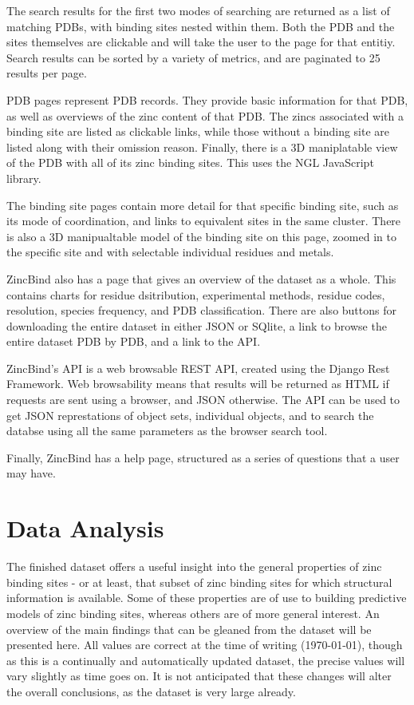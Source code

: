 The search results for the first two modes of searching are returned as a list of matching PDBs, with binding sites nested within them. Both the PDB and the sites themselves are clickable and will take the user to the page for that entitiy. Search results can be sorted by a variety of metrics, and are paginated to 25 results per page.

PDB pages represent PDB records. They provide basic information for that PDB, as well as overviews of the zinc content of that PDB. The zincs associated with a binding site are listed as clickable links, while those without a binding site are listed along with their omission reason. Finally, there is a 3D maniplatable view of the PDB with all of its zinc binding sites. This uses the NGL JavaScript library.

The binding site pages contain more detail for that specific binding site, such as its mode of coordination, and links to equivalent sites in the same cluster. There is also a 3D manipualtable model of the binding site on this page, zoomed in to the specific site and with selectable individual residues and metals.

ZincBind also has a page that gives an overview of the dataset as a whole. This contains charts for residue dsitribution, experimental methods, residue codes, resolution, species frequency, and PDB classification. There are also buttons for downloading the entire dataset in either JSON or SQlite, a link to browse the entire dataset PDB by PDB, and a link to the API.

ZincBind's API is a web browsable REST API, created using the Django Rest Framework. Web browsability means that results will be returned as HTML if requests are sent using a browser, and JSON otherwise. The API can be used to get JSON represtations of object sets, individual objects, and to search the databse using all the same parameters as the browser search tool.

Finally, ZincBind has a help page, structured as a series of questions that a user may have.

\section{Data Analysis}

The finished dataset offers a useful insight into the general properties of zinc binding sites - or at least, that subset of zinc binding sites for which structural information is available. Some of these properties are of use to building predictive models of zinc binding sites, whereas others are of more general interest. An overview of the main findings that can be gleaned from the dataset will be presented here. All values are correct at the time of writing ({\today}), though as this is a continually and automatically updated dataset, the precise values will vary slightly as time goes on. It is not anticipated that these changes will alter the overall conclusions, as the dataset is very large already.

